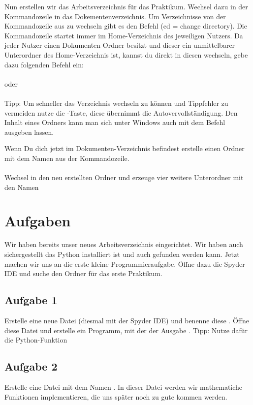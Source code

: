 Nun erstellen wir das Arbeitsverzeichnis für das Praktikum. Wechsel dazu in der Kommandozeile in das Dokementenverzeichnis. Um Verzeichnisse von der Kommandozeile aus zu wechseln gibt es den Befehl  (cd = change directory). Die Kommandozeile startet immer im Home-Verzeichnis des jeweiligen Nutzers. Da jeder Nutzer einen Dokumenten-Ordner besitzt und dieser ein unmittelbarer Unterordner des Home-Verzeichnis ist, kannst du direkt in diesen wechseln, gebe dazu folgenden Befehl ein:\\

\\
oder \\
\\

 Tipp: Um schneller das Verzeichnis wechseln zu können und Tippfehler zu vermeiden nutze die -Taste, diese übernimmt die Autovervollständigung.
 Den Inhalt eines Ordners kann man sich unter Windows auch mit dem Befehl  ausgeben lassen.

Wenn Du dich jetzt im Dokumenten-Verzeichnis befindest erstelle einen Ordner mit dem Namen   aus der Kommandozeile.\\

\\

Wechsel in den neu erstellten Ordner und erzeuge vier weitere Unterordner mit den Namen \\

\section{Aufgaben}
Wir haben bereits unser neues Arbeitsverzeichnis eingerichtet. Wir haben auch sichergestellt das Python installiert ist und auch gefunden werden kann. Jetzt machen wir uns an die erste kleine Programmieraufgabe. Öffne dazu die Spyder IDE und suche den Ordner für das erste Praktikum. 
\subsection{Aufgabe 1}
Erstelle eine neue Datei (diesmal mit der Spyder IDE) und benenne diese . Öffne diese Datei und erstelle ein Programm, mit der der Ausgabe . Tipp: Nutze dafür die Python-Funktion 
\subsection{Aufgabe 2}
Erstelle eine Datei mit dem Namen . In dieser Datei werden wir mathematiche Funktionen implementieren, die uns später noch zu gute kommen werden.
